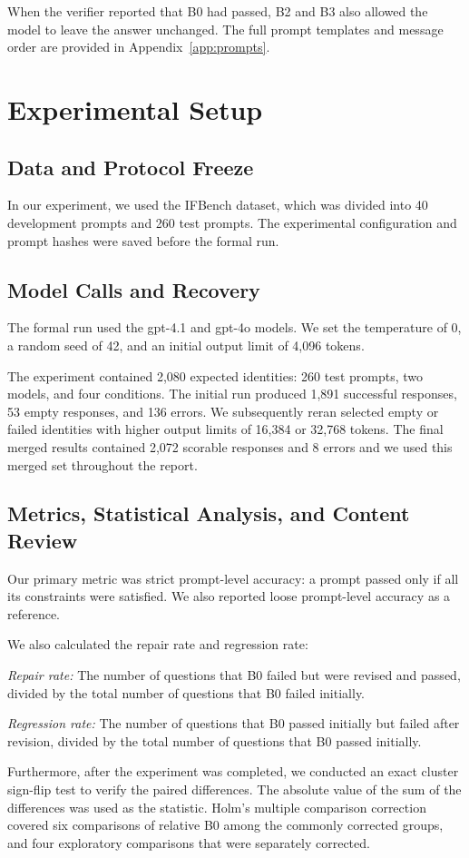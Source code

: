 \documentclass[conference]{IEEEtran}
\begin{document}
When the verifier reported that B0 had passed, B2 and B3 also allowed the model to leave the answer unchanged. The full prompt templates and message order are provided in Appendix~\ref{app:prompts}.
\section{Experimental Setup}
\subsection{Data and Protocol Freeze}
In our experiment, we used the IFBench dataset, which was divided into 40 development prompts and 260 test prompts. The experimental configuration and prompt hashes were saved before the formal run.
\subsection{Model Calls and Recovery}
The formal run used the gpt-4.1 and gpt-4o models. We set the temperature of 0, a random seed of 42, and an initial output limit of 4,096 tokens.

The experiment contained 2,080 expected identities: 260 test prompts, two models, and four conditions. The initial run produced 1,891 successful responses, 53 empty responses, and 136 errors. We subsequently reran selected empty or failed identities with higher output limits of 16,384 or 32,768 tokens. The final merged results contained 2,072 scorable responses and 8 errors and we used this merged set throughout the report.
\subsection{Metrics, Statistical Analysis, and Content Review}
Our primary metric was strict prompt-level accuracy: a prompt passed only if all its constraints were satisfied. We also reported loose prompt-level accuracy as a reference.

We also calculated the repair rate and regression rate:

\textit{Repair rate:} The number of questions that B0 failed but were revised and passed, divided by the total number of questions that B0 failed initially.

\textit{Regression rate:} The number of questions that B0 passed initially but failed after revision, divided by the total number of questions that B0 passed initially.

Furthermore, after the experiment was completed, we conducted an exact cluster sign-flip test to verify the paired differences. The absolute value of the sum of the differences was used as the statistic. Holm's multiple comparison correction covered six comparisons of relative B0 among the commonly corrected groups, and four exploratory comparisons that were separately corrected.
\end{document}
